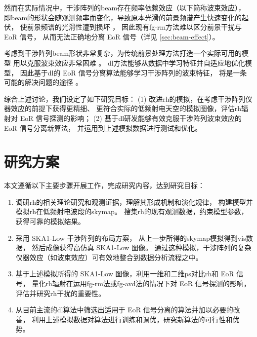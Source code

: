 \begin{itemize}
\hspace{2\ccwd}%
然而在实际情况中，干涉阵列的\ac{beam}存在频率依赖效应（以下简称波束效应），
即\ac{beam}的形状会随观测频率而变化，导致原本光滑的前景频谱产生快速变化的起伏，
使前景频谱的光滑性遭到损坏 \cite{liu2009ps}，
因此现有\ac{fg-rm}方法难以区分前景干扰与 EoR 信号，
从而无法正确地分离 EoR 信号（详见 \autoref{sec:beam-effect}）。

\hspace{2\ccwd}%
考虑到干涉阵列\ac{beam}形状非常复杂，为传统前景处理方法打造一个实际可用的模型
用以克服波束效应非常困难 \cite{lochner2015}。
\ac{dl}方法能够从数据中学习特征并自适应地优化模型，
因此基于\ac{dl}的 EoR 信号分离算法能够学习干涉阵列的波束特征，
将是一条可能的解决问题的途径 \cite{herbel2018,vafaeiSadr2019}。

\end{itemize}

综合上述讨论，我们设定了如下研究目标：
(1) 改进\ac{rh}的模拟，在考虑干涉阵列仪器效应的前提下获得更精细、
更符合实际的低频射电天空的模拟图像，评估\ac{rh}辐射对 EoR 信号探测的影响；
(2) 基于\ac{dl}研发能够有效克服干涉阵列波束效应的 EoR 信号分离新算法，
并运用到上述模拟数据进行测试和优化。


\section{研究方案}

本文遵循以下主要步骤开展工作，完成研究内容，达到研究目标：
\begin{enumerate}
\item
调研\ac{rh}的相关理论研究和观测证据，理解其形成机制和演化规律，
构建模型并模拟\ac{rh}在低频射电波段的\ac{skymap}。
搜集\ac{rh}的现有观测数据，约束模型参数，获得可靠的模拟结果。

\item
采用 SKA1-Low 干涉阵列的布局方案，
从上一步所得的\ac{skymap}模拟得到\ac{vis}数据，
然后成像获得高仿真 SKA1-Low 图像。
通过这种模拟，干涉阵列的复杂仪器效应（如波束效应）可有效地整合到数据分析流程之中。

\item
基于上述模拟所得的 SKA1-Low 图像，利用一维和二维\ac{ps}对比\ac{rh}和 EoR 信号，
量化\ac{rh}辐射在运用\ac{fg-rm}法或\ac{fg-avd}法的情况下对 EoR 信号探测的影响，
评估并研究\ac{rh}干扰的重要性。

\item
从目前主流的\ac{dl}算法中筛选出适用于 EoR 信号分离的算法并加以必要的改善，
利用上述模拟数据对算法进行训练和调优，研究新算法的可行性和优势。

\end{enumerate}


